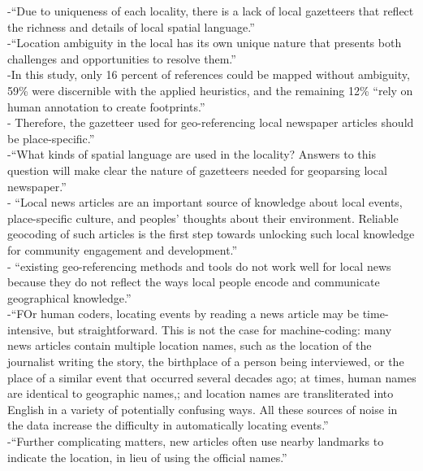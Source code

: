 -{\color{orange}“Due to uniqueness of each locality, there is a lack of local gazetteers that reflect the richness and details of local spatial language.”\cite{Cai2016}}\\
-{\color{orange}“Location ambiguity in the local has its own unique nature that presents both challenges and opportunities to resolve them.”\cite{Cai2016}}\\
-{\color{orange}In this study, only 16 percent of references could be mapped without ambiguity, 59\% were discernible with the applied heuristics, and the remaining 12\% “rely on human annotation to create footprints.”\cite{Cai2016}}\\
-{\color{orange} Therefore, the gazetteer used for geo-referencing local newspaper articles should be place-specific.”\cite{Cai2016}}\\
-{\color{orange}“What kinds of spatial language are used in the locality? Answers to this question will make clear the nature of gazetteers needed for geoparsing local newspaper.”\cite{Cai2016}}\\
-{\color{orange} “Local news articles are an important source of knowledge about local events, place-specific culture, and peoples’ thoughts about their environment. Reliable geocoding of such articles is the first step towards unlocking such local knowledge for community engagement and development.”\cite{Cai2016}}\\
-{\color{orange} “existing geo-referencing methods and tools do not work well for local news because they do not reflect the ways local people encode and communicate geographical knowledge.”\cite{Cai2016}}\\
-{\color{orange}“FOr human coders, locating events by reading a news article may be time-intensive, but straightforward. This is not the case for machine-coding: many news articles contain multiple location names, such as the location of the journalist writing the story, the birthplace of a  person being interviewed, or the place of a similar event that occurred several decades ago; at times, human names are identical to geographic names,; and location names are transliterated into English in a variety of potentially confusing ways. All these sources of noise in the data increase the difficulty in automatically locating events.”\cite{Lee2019}}\\
-{\color{orange}“Further complicating matters, new articles often use nearby landmarks to indicate the location, in lieu of using the official names.”\cite{Lee2019}}\\

